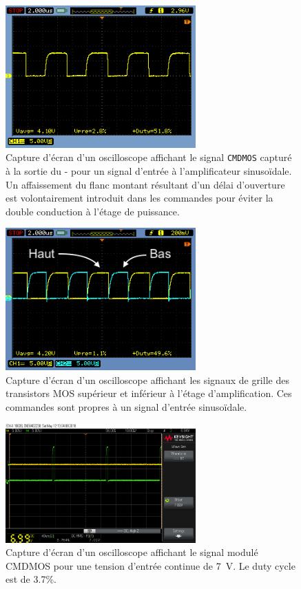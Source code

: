 \documentclass[10pt, oneside, a4paper]{article}
\begin{document}
\begin{figure}[p]
	\centering
	\includegraphics[width=0.65\textwidth]{image/osci-cmdmos.png}
	\caption{Capture d'écran d'un oscilloscope affichant le signal \texttt{CMDMOS}
			 capturé à la sortie du \Sigma{}-\Delta{} pour un signal d'entrée à
			 l'amplificateur sinusoïdale.
			 Un affaissement du flanc montant résultant d'un délai d'ouverture est
			 volontairement introduit dans les commandes pour éviter la double conduction
			 à l'étage de puissance.}
	\label{fig:osci-cmdmos}
\end{figure}

\begin{figure}[p]
	\centering
	\includegraphics[width=0.65\textwidth]{image/osci-high-low.png}
	\caption{Capture d'écran d'un oscilloscope affichant les signaux de grille des
			 transistors MOS supérieur et inférieur à l'étage d'amplification.
			 Ces commandes sont propres à un signal d'entrée sinusoïdale.}
	\label{fig:osci-high-low}
\end{figure}

\begin{figure}[p]
	\centering
	\includegraphics[width=0.65\textwidth]{image/12-05/scope_2.png}
	\caption{Capture d'écran d'un oscilloscope affichant le signal modulé CMDMOS pour une
			 tension d'entrée continue de \SI{7}{\volt}. Le duty cycle est de \num{3.7}\%.}
	\label{fig:scope-2}
\end{figure}
\end{document}
